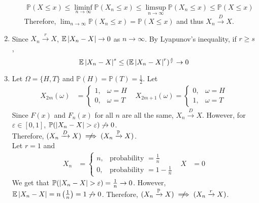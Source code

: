 \documentclass{huhtakm-template-book}
\newcommand{\prob}{\mathbb{P}}
\newcommand{\expect}{\mathbb{E}}
\begin{document}
\begin{proofing}
\begin{enumerate}
\begin{enumerate}
\begin{equation*}
                    \prob(X\leq x)\leq\liminf_{n\to\infty}\prob(X_{n}\leq x)\leq\limsup_{n\to\infty}\prob(X_{n}\leq x)\leq\prob(X\leq x)
                \end{equation*}
                Therefore, $\lim_{n\to\infty}\prob(X_{n}\leq x)=\prob(X\leq x)$ and thus $X_{n}\xrightarrow{D}X$.
            \end{enumerate}
            \item Since $X_{n}\xrightarrow{r}X$, $\expect\abs{X_{n}-X}\to 0$ as $n\to\infty$. By Lyapunov's inequality, if $r\geq s$,
            \begin{equation*}
                \expect\abs{X_{n}-X}^{s}\leq(\expect\abs{X_{n}-X}^{r})^{\frac{s}{r}}\to 0
            \end{equation*}
            \item Let $\Omega=\{H,T\}$ and $\prob(H)=\prob(T)=\frac{1}{2}$. Let
            \begin{align*}
                X_{2m}(\omega)&=\begin{cases}
                    1, &\omega=H\\
                    0, &\omega=T
                \end{cases} & X_{2m+1}(\omega)=\begin{cases}
                    0, &\omega=H\\
                    1, &\omega=T
                \end{cases}
            \end{align*}
            Since $F(x)$ and $F_{n}(x)$ for all $n$ are all the same, $X_{n}\xrightarrow{D}X$. However, for $\varepsilon\in[0,1]$, $\prob(\abs{X_{n}-X}>\varepsilon)\not\to 0$.\\
            Therefore, $(X_{n}\xrightarrow{D}X)\centernot\implies(X_{n}\xrightarrow{\prob}X)$.\\
            Let $r=1$ and
            \begin{align*}
                X_{n}&=\begin{cases}
                    n, &\text{probability }=\frac{1}{n}\\
                    0, &\text{probability }=1-\frac{1}{n}
                \end{cases} & X&=0
            \end{align*}
            We get that $\prob(\abs{X_{n}-X}>\varepsilon)=\frac{1}{n}\to 0$. However, $\expect\abs{X_{n}-X}=n\left(\frac{1}{n}\right)=1\not\to 0$. Therefore, $(X_{n}\xrightarrow{\prob}X)\centernot\implies(X_{n}\xrightarrow{r}X)$.\\

\end{enumerate}
\end{proofing}
\end{document}
